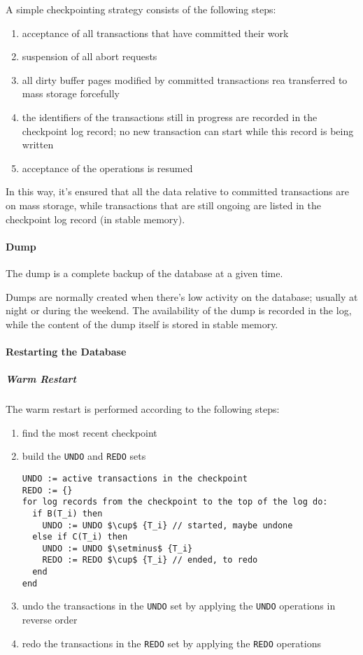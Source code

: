 \documentclass[english]{article}
\begin{document}
A simple checkpointing strategy consists of the following steps:

\begin{enumerate}
  \item acceptance of all transactions that have committed their work
  \item suspension of all abort requests
  \item all dirty buffer pages modified by committed transactions rea transferred to mass storage forcefully
  \item the identifiers of the transactions still in progress are recorded in the checkpoint log record; no new transaction can start while this record is being written
  \item acceptance of the operations is resumed
\end{enumerate}

In this way, it's ensured that all the data relative to committed transactions are on mass storage, while transactions that are still ongoing are listed in the checkpoint log record (in stable memory).

\paragraph{Dump}

The dump is a complete backup of the database at a given time.

Dumps are normally created when there's low activity on the database; usually at night or during the weekend.
The availability of the dump is recorded in the log, while the content of the dump itself is stored in stable memory.

\paragraph{Restarting the Database}

\subparagraph*{Warm Restart}
The warm restart is performed according to the following steps:

\begin{enumerate}
  \item find the most recent checkpoint
  \item build the \texttt{UNDO} and \texttt{REDO} sets
        \begin{lstlisting}
UNDO := active transactions in the checkpoint
REDO := {}
for log records from the checkpoint to the top of the log do:
  if B(T_i) then
    UNDO := UNDO $\cup$ {T_i} // started, maybe undone
  else if C(T_i) then
    UNDO := UNDO $\setminus$ {T_i}
    REDO := REDO $\cup$ {T_i} // ended, to redo
  end
end
  \end{lstlisting}
  \item undo the transactions in the \texttt{UNDO} set by applying the \texttt{UNDO} operations in reverse order
  \item redo the transactions in the \texttt{REDO} set by applying the \texttt{REDO} operations
\end{enumerate}
\end{document}
